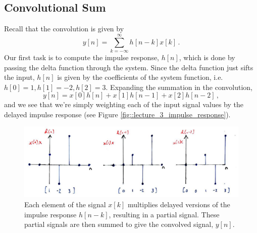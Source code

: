 \subsection{Convolutional Sum}
%
Recall that the convolution is given by
%
\begin{displaymath}
  y[n] = \sum_{k=-\infty}^\infty h[n-k] x[k] \,.
\end{displaymath}
%
Our first task is to compute the impulse response, $h[n]$, which is done by passing
the delta function through the system. Since the delta function just sifts the input,
$h[n]$ is given by the coefficients of the system function, i.e.
$h[0] = 1, h[1] = -2, h[2] = 3$. Expanding the summation in the convolution,
%
\begin{displaymath}
  y[n] = x[0]h[n] + x[1]h[n-1] + x[2]h[n-2] \,,
\end{displaymath}
%
and we see that we're simply weighting each of the input signal values by the
delayed impulse response (see Figure \ref{fig::lecture_3_impulse_response}).
%
\begin{figure}[!htb]
  \includegraphics[width=\textwidth]{images/lecture_3_impulse_response_weighting.JPG}
  \caption{
    Each element of the signal $x[k]$ multiplies delayed versions of the impulse
    response $h[n-k]$, resulting in a partial signal. These partial signals are
    then summed to give the convolved signal, $y[n]$.
  }
  \label{fig::lecture_3_impulse_response_weighting}
\end{figure}

